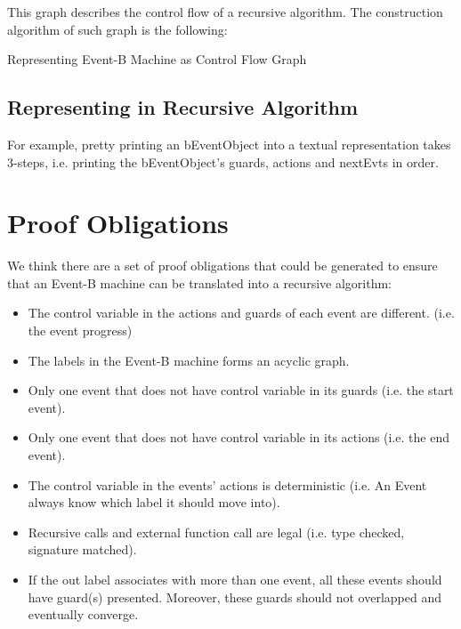 \documentclass{easychair}
\newcommand*\Let[2]{\State #1 $\gets$ #2}
\def\ForEach{\ForAll}
\begin{document}
This graph describes the control flow of a recursive algorithm. The construction algorithm of such graph is the following:
\begin{algorithm}
  \caption{Representing Event-B Machine as Control Flow Graph
    \label{alg:cfg}}
  \begin{algorithmic}[1]
    \Statex
      \ForEach{event $e \in nextEvts $}
        \State
      \EndFor
      \State {}
    \EndFunction
  \end{algorithmic}
\end{algorithm}


\subsection{Representing in Recursive Algorithm}

For example, pretty printing an bEventObject into a textual representation takes 3-steps, i.e. printing the bEventObject's guards, actions and nextEvts in order.

\section{Proof Obligations}
We think there are a set of proof obligations that could be generated to ensure that an Event-B machine can be translated into a recursive algorithm:
\begin{itemize}
	\item The control variable in the actions and guards of each event are different. (i.e. the event progress)
	\item The labels in the Event-B machine forms an acyclic graph.
	\item Only one event that does not have control variable in its guards (i.e. the start event).
	\item Only one event that does not have control variable in its actions (i.e. the end event).
	\item The control variable in the events' actions is deterministic (i.e. An Event always know which label it should move into).
	\item Recursive calls and external function call are legal (i.e. type checked, signature matched).
	\item If the out label associates with more than one event, all these events should have guard(s) presented. Moreover, these guards should not overlapped and eventually converge.
\end{itemize}
\end{document}
